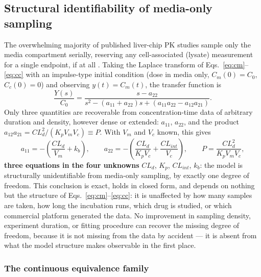 \subsection*{Structural identifiability of media-only sampling}

The overwhelming majority of published liver-chip PK studies sample only the media compartment serially, reserving any cell-associated (lysate) measurement for a single endpoint, if at all \citep{docci2022,rajan2023}. Taking the Laplace transform of Eqs.~\eqref{eq:cm}--\eqref{eq:cc} with an impulse-type initial condition (dose in media only, $C_m(0)=C_0$, $C_c(0)=0$) and observing $y(t)=C_m(t)$, the transfer function is
\begin{equation}
\frac{Y(s)}{C_0} = \frac{s - a_{22}}{s^2 - (a_{11}+a_{22})s + (a_{11}a_{22} - a_{12}a_{21})}. \label{eq:transferfn}
\end{equation}
Only three quantities are recoverable from concentration-time data of arbitrary duration and density, however dense or extended: $a_{11}$, $a_{22}$, and the product $a_{12}a_{21} = CL_d^2/(K_p V_m V_c) \equiv P$. With $V_m$ and $V_c$ known, this gives
\begin{equation}
a_{11} = -\left(\frac{CL_d}{V_m}+k_b\right), \qquad a_{22} = -\left(\frac{CL_d}{K_p V_c}+\frac{CL_{int}}{V_c}\right), \qquad P = \frac{CL_d^2}{K_p V_m V_c}, \label{eq:threeeqns}
\end{equation}
\textbf{three equations in the four unknowns} $CL_d$, $K_p$, $CL_{int}$, $k_b$: the model is structurally unidentifiable from media-only sampling, by exactly one degree of freedom. This conclusion is exact, holds in closed form, and depends on nothing but the structure of Eqs.~\eqref{eq:cm}--\eqref{eq:cc}: it is unaffected by how many samples are taken, how long the incubation runs, which drug is studied, or which commercial platform generated the data. No improvement in sampling density, experiment duration, or fitting procedure can recover the missing degree of freedom, because it is not missing from the data by accident --- it is absent from what the model structure makes observable in the first place.

\subsubsection*{The continuous equivalence family}

